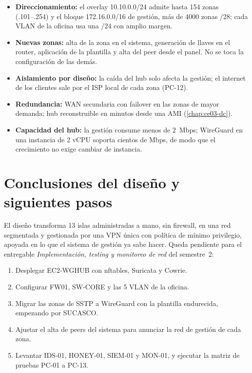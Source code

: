 \begin{itemize}
  \item \textbf{Direccionamiento:} el overlay 10.10.0.0/24 admite hasta 154 zonas
  (.101--.254) y el bloque 172.16.0.0/16 de gestión, más de 4000 zonas /28; cada VLAN de
  la oficina usa una /24 con amplio margen.
  \item \textbf{Nuevas zonas:} alta de la zona en el sistema, generación de llaves en el
  router, aplicación de la plantilla y alta del peer desde el panel. No se toca la
  configuración de las demás.
  \item \textbf{Aislamiento por diseño:} la caída del hub solo afecta la gestión; el
  internet de los clientes sale por el ISP local de cada zona (PC-12).
  \item \textbf{Redundancia:} WAN secundaria con failover en las zonas de mayor
  demanda; hub reconstruible en minutos desde una AMI (\cref{chap:ce03-dc}).
  \item \textbf{Capacidad del hub:} la gestión consume menos de 2~Mbps; WireGuard en una
  instancia de 2 vCPU soporta cientos de Mbps, de modo que el crecimiento no exige
  cambiar de instancia.
\end{itemize}

\section{Conclusiones del diseño y siguientes pasos}

El diseño transforma 13 islas administradas a mano, sin firewall, en una red
segmentada y gestionada por una VPN única con política de mínimo privilegio, apoyada
en lo que el sistema de gestión ya sabe hacer. Queda pendiente para el entregable
\emph{Implementación, testing y monitoreo de red} del semestre~2:

\begin{enumerate}
  \item Desplegar EC2-WGHUB con nftables, Suricata y Cowrie.
  \item Configurar FW01, SW-CORE y las 5 VLAN de la oficina.
  \item Migrar las zonas de SSTP a WireGuard con la plantilla endurecida, empezando por SUCASCO.
  \item Ajustar el alta de peers del sistema para anunciar la red de gestión de cada zona.
  \item Levantar IDS-01, HONEY-01, SIEM-01 y MON-01, y ejecutar la matriz de pruebas PC-01 a PC-13.
\end{enumerate}

